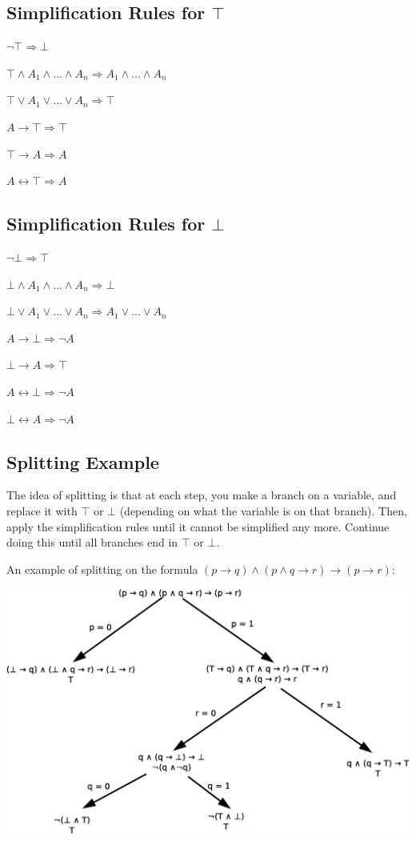 \documentclass[11pt,a4paper]{article}
\begin{document}
\subsection{Simplification Rules for $\top$}

$\neg \top \Rightarrow \bot$

$\top \wedge A_1 \wedge ... \wedge A_n \Rightarrow A_1 \wedge ... \wedge A_n$

$\top \vee A_1 \vee ... \vee A_n \Rightarrow \top$

$A \rightarrow \top \Rightarrow \top$

$\top \rightarrow A \Rightarrow A$

$A \leftrightarrow \top \Rightarrow A$

\subsection{Simplification Rules for $\bot$}

$\neg \bot \Rightarrow \top$

$\bot \wedge A_1 \wedge ... \wedge A_n \Rightarrow \bot$

$\bot \vee A_1 \vee ... \vee A_n \Rightarrow A_1 \vee ... \vee A_n$

$A \rightarrow \bot \Rightarrow \neg A$

$\bot \rightarrow A \Rightarrow \top$

$A \leftrightarrow \bot \Rightarrow \neg A$

$\bot \leftrightarrow A \Rightarrow \neg A$

\subsection{Splitting Example}

The idea of splitting is that at each step, you make a branch on a variable, and replace it with $\top$ or $\bot$ (depending on what the variable is on that branch).
Then, apply the simplification rules until it cannot be simplified any more.
Continue doing this until all branches end in $\top$ or $\bot$.

An example of splitting on the formula $(p \rightarrow q) \wedge (p \wedge q \rightarrow r) \rightarrow (p \rightarrow r)$:

\centerline{\includegraphics[width=1.00\textwidth]{SplittingExample.eps}}
\end{document}

